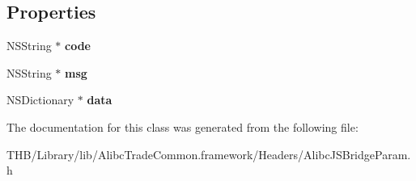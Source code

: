 \subsection*{Properties}
\begin{DoxyCompactItemize}
\item 
\mbox{\label{interface_alibc_j_s_bridge_result_abc68bbdd4f33d7ee76ec03266632f6f6}} 
N\+S\+String $\ast$ {\bfseries code}
\item 
\mbox{\label{interface_alibc_j_s_bridge_result_a22d6debad31e8560fc7f9afd80b4dca3}} 
N\+S\+String $\ast$ {\bfseries msg}
\item 
\mbox{\label{interface_alibc_j_s_bridge_result_a848552beaf39c2cf965ed790caeb0866}} 
N\+S\+Dictionary $\ast$ {\bfseries data}
\end{DoxyCompactItemize}


The documentation for this class was generated from the following file\+:\begin{DoxyCompactItemize}
\item 
T\+H\+B/\+Library/lib/\+Alibc\+Trade\+Common.\+framework/\+Headers/Alibc\+J\+S\+Bridge\+Param.\+h\end{DoxyCompactItemize}
